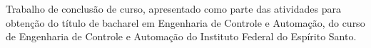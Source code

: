 {
\center          
{\MakeUppercase{\imprimirautor}}\par
\vfill
{\bfseries\MakeUppercase\imprimirtitulo}\par
\vspace{10 mm}
\hspace{.35\textwidth}
\begin{minipage}{.6\textwidth}
    \SingleSpacing
    {\fontsize{10}{12}\selectfont
    Trabalho de conclusão de curso, apresentado como parte das atividades para obtenção do título de bacharel em Engenharia de Controle e Automação, do curso de Engenharia de Controle e Automação do Instituto Federal do Espírito Santo.
    \par
    \par
    \vspace{0.5cm}
    \imprimirorientadorRotulo
    \imprimirorientador\par
    \imprimircoorientadorRotulo
    \imprimircoorientador\par
    }
\end{minipage}
\vfill 
\vfill
{\MakeUppercase\imprimirlocal}\par
{\imprimirdata}\par
}